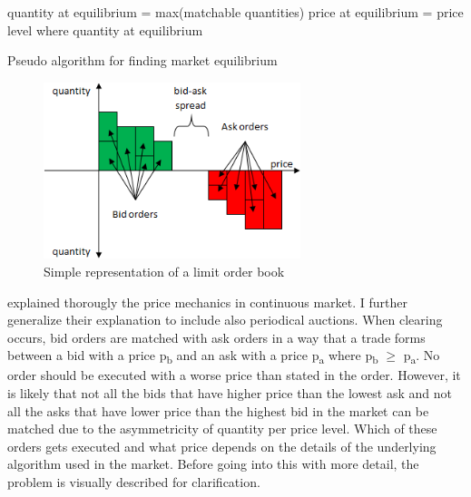 \begin{algorithm}[H]
    \SetAlgoLined
    quantity at equilibrium = max(matchable quantities)\;
    price at equilibrium = price level where quantity at equilibrium\;
     \caption{Pseudo algorithm for finding market equilibrium}
     \label{alg:lob_equil}
\end{algorithm}


\begin{figure}
    \begin{center}  
        \includegraphics[width=7.5cm]{diagrams/lob_repr.png}
        \caption{Simple representation of a limit order book}
        \label{fig:lob_repr}
    \end{center}
\end{figure}

\citet{lob13} explained thorougly the price mechanics in continuous market. I 
further generalize their explanation to include also periodical auctions.
When clearing occurs, bid orders are matched with ask orders in a way that a 
trade forms between a bid with a price p\textsubscript{b} and an ask with a price 
p\textsubscript{a} where p\textsubscript{b} $\geq$ p\textsubscript{a}. No order
should be executed with a worse price than stated in the order. However, it is likely
that not all the bids that have higher price than the lowest ask and not all the asks that
have lower price than the highest bid in the market can be matched due to the asymmetricity 
of quantity per price level. Which of these orders gets executed and what price depends on 
the details of the underlying algorithm used in the market. Before going into this with more
detail, the problem is visually described for clarification.

